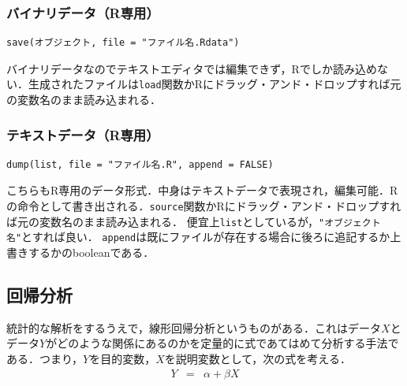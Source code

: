 \subsubsection{バイナリデータ（R専用）}
\begin{screen}
\begin{verbatim}
save(オブジェクト, file = "ファイル名.Rdata")
\end{verbatim}
\end{screen}
バイナリデータなのでテキストエディタでは編集できず，Rでしか読み込めない．生成されたファイルは\verb+load+関数かRにドラッグ・アンド・ドロップすれば元の変数名のまま読み込まれる．

\subsubsection{テキストデータ（R専用）}
\begin{screen}
\begin{verbatim}
dump(list, file = "ファイル名.R", append = FALSE)
\end{verbatim}
\end{screen}
こちらもR専用のデータ形式．中身はテキストデータで表現され，編集可能．Rの命令として書き出される．\verb+source+関数かRにドラッグ・アンド・ドロップすれば元の変数名のまま読み込まれる．
便宜上\verb+list+としているが，\verb+"オブジェクト名"+とすれば良い．
\verb+append+は既にファイルが存在する場合に後ろに追記するか上書きするかのbooleanである．
\subsection{回帰分析}
統計的な解析をするうえで，線形回帰分析というものがある．これはデータ$X$とデータ$Y$がどのような関係にあるのかを定量的に式であてはめて分析する手法である．つまり，$Y$を目的変数，$X$を説明変数として，次の式を考える．
\begin{eqnarray*}
Y&=&\alpha +\beta X
\end{eqnarray*}

